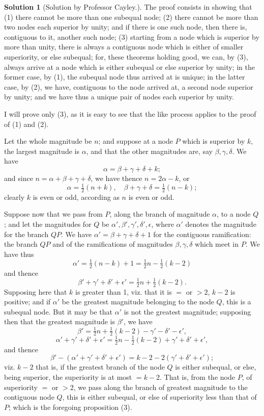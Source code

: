 \documentclass[11pt,a4paper]{article}
\theoremstyle{definition}
\newtheorem*{solution}{Solution}
\begin{document}
\begin{solution}[Solution by Professor Cayley.]
The proof consists in showing that (1) there cannot be more than one subequal node; (2) there cannot be more than two nodes each superior by unity; and if there is one such node, then there is, contiguous to it, another such node; (3) starting from a node which is superior by more than unity, there is always a contiguous node which is either of smaller superiority, or else subequal; for, these theorems holding good, we can, by (3), always arrive at a node which is either subequal or else superior by unity; in the former case, by (1), the subequal node thus arrived at is unique; in the latter case, by (2), we have, contiguous to the node arrived at, a second node superior by unity; and we have thus a unique pair of nodes each superior by unity.

I will prove only (3), as it is easy to see that the like process applies to the proof of (1) and (2).

Let the whole magnitude be $n$; and suppose at a node $P$ which is superior by $k$, the largest magnitude is $\alpha$, and that the other magnitudes are, say $\beta, \gamma, \delta$. We have
\[
\alpha = \beta + \gamma + \delta + k;
\]
and since $n = \alpha + \beta + \gamma + \delta$, we have thence $n = 2\alpha - k$, or
\[
\alpha = \tfrac{1}{2}(n+k), \quad \beta + \gamma + \delta = \tfrac{1}{2}(n-k);
\]
clearly $k$ is even or odd, according as $n$ is even or odd.

Suppose now that we pass from $P$, along the branch of magnitude $\alpha$, to a node $Q$; and let the magnitudes for $Q$ be $\alpha', \beta', \gamma', \delta', \epsilon$, where $\alpha'$ denotes the magnitude for the branch $QP$. We have $\alpha' = \beta + \gamma + \delta + 1$ for the contiguous ramification: the branch $QP$ and of the ramifications of magnitudes $\beta, \gamma, \delta$ which meet in $P$. We have thus
\[
\alpha' = \tfrac{1}{2}(n-k) + 1 = \tfrac{1}{2}n - \tfrac{1}{2}(k-2)
\]
and thence
\[
\beta' + \gamma' + \delta' + \epsilon' = \tfrac{1}{2}n + \tfrac{1}{2}(k-2).
\]
Supposing here that $k$ is greater than 1, viz. that it is $=$ or $> 2$, $k-2$ is positive; and if $\alpha'$ be the greatest magnitude belonging to the node $Q$, this is a subequal node. But it may be that $\alpha'$ is not the greatest magnitude; supposing then that the greatest magnitude is $\beta'$, we have
\[
\beta' = \tfrac{1}{2}n + \tfrac{1}{2}(k-2) - \gamma' - \delta' - \epsilon',
\]
\[
\alpha' + \gamma' + \delta' + \epsilon' = \tfrac{1}{2}n - \tfrac{1}{2}(k-2) + \gamma' + \delta' + \epsilon',
\]
and thence
\[
\beta' - (\alpha' + \gamma' + \delta' + \epsilon') = k-2 - 2(\gamma' + \delta' + \epsilon');
\]
viz. $k-2$ that is, if the greatest branch of the node $Q$ is either subequal, or else, being superior, the superiority is at most $= k-2$. That is, from the node $P$, of superiority $=$ or $> 2$, we pass along the branch of greatest magnitude to the contiguous node $Q$, this is either subequal, or else of superiority less than that of $P$; which is the foregoing proposition (3).


\end{solution}
\end{document}

